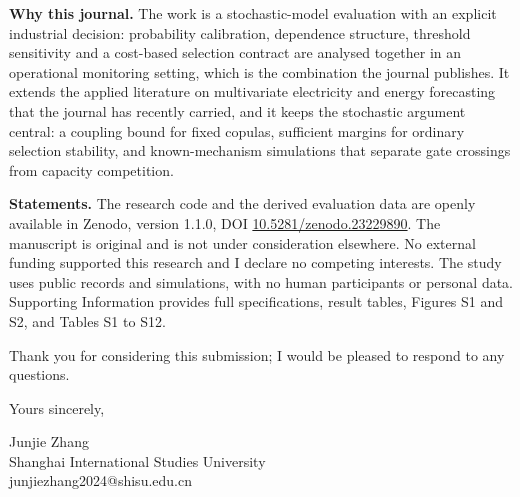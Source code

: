 \documentclass[10pt,a4paper]{article}
\begin{document}
\textbf{Why this journal.} The work is a stochastic-model evaluation with an explicit industrial decision: probability calibration, dependence structure, threshold sensitivity and a cost-based selection contract are analysed together in an operational monitoring setting, which is the combination the journal publishes. It extends the applied literature on multivariate electricity and energy forecasting that the journal has recently carried, and it keeps the stochastic argument central: a coupling bound for fixed copulas, sufficient margins for ordinary selection stability, and known-mechanism simulations that separate gate crossings from capacity competition.

\textbf{Statements.} The research code and the derived evaluation data are openly available in Zenodo, version 1.1.0, DOI \href{https://doi.org/10.5281/zenodo.23229890}{10.5281/zenodo.23229890}. The manuscript is original and is not under consideration elsewhere. No external funding supported this research and I declare no competing interests. The study uses public records and simulations, with no human participants or personal data. Supporting Information provides full specifications, result tables, Figures S1 and S2, and Tables S1 to S12.

Thank you for considering this submission; I would be pleased to respond to any questions.

Yours sincerely,

\vspace{8pt}
Junjie Zhang\\
Shanghai International Studies University\\
junjiezhang2024@shisu.edu.cn
\end{document}
